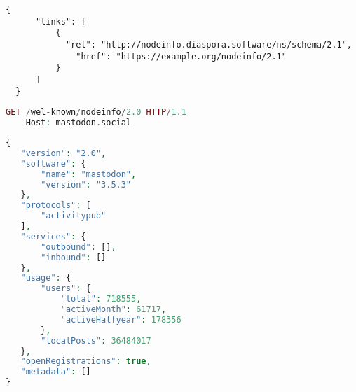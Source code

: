 
\lstset{style=JSONStyle}
\begin{lstlisting}[caption=NodeInfo response example, label=NodeInfo response example, float=h]
  {
      "links": [
          {
            "rel": "http://nodeinfo.diaspora.software/ns/schema/2.1",
              "href": "https://example.org/nodeinfo/2.1"
          }
      ]
  }
\end{lstlisting}

\lstset{style=JSONStyle}
\begin{lstlisting}[language=PHP, caption=NodeInfo request]
    GET /wel-known/nodeinfo/2.0 HTTP/1.1
    Host: mastodon.social
\end{lstlisting}

\lstset{style=JSONStyle}
\begin{lstlisting}[language=PHP, caption=NodeInfo response for mastodon.social, label=fig:nodeinfo_response, float=h]
{
   "version": "2.0",
   "software": {
       "name": "mastodon",
       "version": "3.5.3"
   },
   "protocols": [
       "activitypub"
   ],
   "services": {
       "outbound": [],
       "inbound": []
   },
   "usage": {
       "users": {
           "total": 718555,
           "activeMonth": 61717,
           "activeHalfyear": 178356
       },
       "localPosts": 36484017
   },
   "openRegistrations": true,
   "metadata": []
}
\end{lstlisting}


